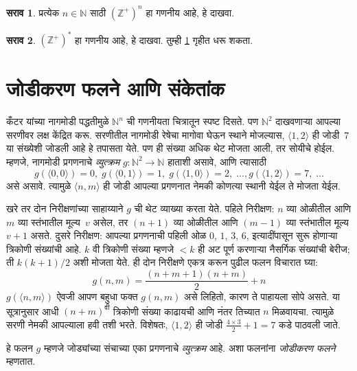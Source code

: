 \documentclass[11pt,a4paper,openany]{book}
\theoremstyle{definition}
\newtheorem{prob}{सराव}[chapter]
\newenvironment{explain}{}{}
\newcommand{\tuple}[1]{\langle #1\rangle}
\newcommand{\Nat}{\mathbb{N}}
\newcommand{\PosInt}{\mathbb{Z}^{+}}
\begin{document}
\begin{prob}\label{sfr:siz:zigzag:prob:posint-n}
प्रत्येक $n \in \Nat$ साठी $(\PosInt)^n$ हा गणनीय आहे, हे दाखवा.
\end{prob}

\begin{prob}\label{sfr:siz:zigzag:prob:posint-star}
  $(\PosInt)^*$ हा गणनीय आहे, हे दाखवा. तुम्ही \ref{sfr:siz:zigzag:prob:posint-n} गृहीत धरू शकता.
\end{prob}








\section{जोडीकरण फलने आणि संकेतांक}\label{sfr:siz:pai:sec}

\begin{explain}
कँटर यांच्या नागमोडी पद्धतीमुळे $\Nat^n$ ची गणनीयता चित्रातून
स्पष्ट दिसते. पण $\Nat^2$ दाखवणाऱ्या आपल्या सरणीवर लक्ष केंद्रित करू.
सरणीतील नागमोडी रेषेचा मागोवा घेऊन स्थाने मोजल्यास,
$\tuple{1,2}$ ही जोडी~$7$ या संख्येशी जोडली आहे हे तपासता येते.
पण ही संख्या अधिक थेट मोजता आली, तर सोयीचे होईल. म्हणजे, नागमोडी
प्रगणनाचे \emph{व्युत्क्रम} $g\colon \Nat^2 \to \Nat$ हाताशी असावे,
आणि त्यासाठी
\[
g(\tuple{0,0}) = 0, \;
g(\tuple{0,1}) = 1, \;
g(\tuple{1,0}) = 2, \; \dots,
g(\tuple{1,2}) = 7, \; \dots
\]
असे असावे. त्यामुळे $\tuple{n, m}$ ही जोडी आपल्या प्रगणनात नेमकी
कोणत्या स्थानी येईल ते मोजता येईल.

खरे तर दोन निरीक्षणांच्या साहाय्याने $g$ ची थेट व्याख्या करता येते.
पहिले निरीक्षण: $n$ व्या ओळीतील आणि $m$ व्या स्तंभातील मूल्य~$v$
असेल, तर $(n+1)$ व्या ओळीतील आणि $(m-1)$ व्या स्तंभातील मूल्य
$v + 1$ असते. दुसरे निरीक्षण: आपल्या प्रगणनाची पहिली ओळ $0$, $1$,
$3$, $6$, इत्यादींपासून सुरू होणाऱ्या त्रिकोणी संख्यांची आहे.
$k$ वी त्रिकोणी संख्या म्हणजे $< k$ ही अट पूर्ण करणाऱ्या नैसर्गिक संख्यांची
बेरीज; ती $k(k+1)/2$ अशी मोजता येते. ही दोन निरीक्षणे एकत्र करून
पुढील फलन विचारात घ्या:
\[
  g(n,m) = \frac{(n+m+1)(n+m)}{2} + n
\]
$g(\tuple{n, m})$ ऐवजी आपण बहुधा फक्त $g(n, m)$ असे लिहितो, कारण
ते पाहायला सोपे असते. या सूत्रानुसार आधी $(n+m)^\text{वी}$ त्रिकोणी
संख्या काढायची आणि नंतर तिच्यात $n$ मिळवायचा. त्यामुळे सरणी नेमकी
आपल्याला हवी तशी भरते. विशेषतः, $\tuple{1, 2}$ ही जोडी
$\frac{4 \times 3}{2} + 1 = 7$ कडे पाठवली जाते.

हे फलन $g$ म्हणजे जोड्यांच्या संचाच्या एका प्रगणनाचे \emph{व्युत्क्रम}
आहे. अशा फलनांना \emph{जोडीकरण फलने} म्हणतात.
\end{explain}
\end{document}
